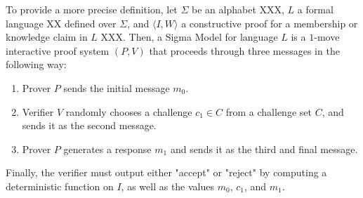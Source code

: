 To provide a more precise definition, let $\Sigma$ be an alphabet XXX, $L$ a formal language XX defined over $\Sigma$, and $\langle I, W\rangle$ a constructive proof for a membership or knowledge claim in $L$ XXX. Then, a Sigma Model for language $L$ is a $1$-move interactive proof system $(P,V)$ that proceeds through three messages in the following way:
\begin{enumerate}
\label{def_sigma-model}
\item Prover $P$ sends the initial message $m_0$.
\item Verifier $V$ randomly chooses a challenge $c_1\in C$ from a challenge set $C$, and sends it as the second message.
\item Prover $P$ generates a response $m_1$ and sends it as the third and final message.
\end{enumerate}
Finally, the verifier must output either "accept" or "reject" by computing a deterministic function on $I$, as well as the values $m_0$, $c_1$, and $m_1$.
